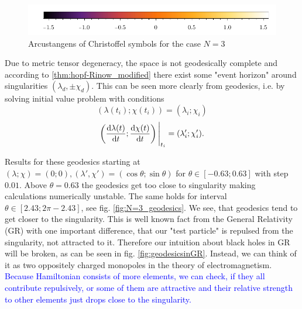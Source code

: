 \begin{figure}[h]
\begin{tabular}{cc}
    \end{tabular}
\includegraphics{../img/N=3_barA.pdf}
    \caption{Arcustangens of Christoffel symbols for the case $N=3$}
    \label{fig:N=3_G}
\end{figure}

Due to metric tensor degeneracy, the space is not geodesically complete and according to \ref{thm:hopf-Rinow_modified} there exist some "event horizon" around singularities $(\lambda_d,\pm \chi_d)$. This can be seen more clearly from geodesics, i.e. by solving initial value problem with conditions
$$(\lambda(t_i);\chi(t_i))=(\lambda_i;\chi_i)$$
$$\left(\frac{\mathrm{d} \lambda(t)}{\mathrm{d} t};\frac{\mathrm{d} \chi(t)}{\mathrm{d} t}\right)\Bigg|_{t_i}=(\lambda'_i;\chi'_i).$$

Results for these geodesics starting at $(\lambda;\chi)=(0;0), (\lambda',\chi')=(\cos\theta;\sin\theta)$ for $\theta\in [-0.63;0.63]$ with step $0.01$. Above $\theta=0.63$ the geodesics get too close to singularity making calculations numerically unstable. The same holds for interval $\theta\in [2.43;2\pi-2.43]$, see fig. \ref{fig:N=3_geodesics}. We see, that geodesics tend to get closer to the singularity. This is well known fact from the General Relativity (GR) with one important difference, that our "test particle" is repulsed from the singularity, not attracted to it. Therefore our intuition about black holes in GR will be broken, as can be seen in fig. \ref{fig:geodesicsinGR}. Instead, we can think of it as two oppositely charged monopoles in the theory of electromagnetism. \textcolor{blue}{Because Hamiltonian consists of more elements, we can check, if they all contribute repulsively, or some of them are attractive and their relative strength to other elements just drops close to the singularity.}

